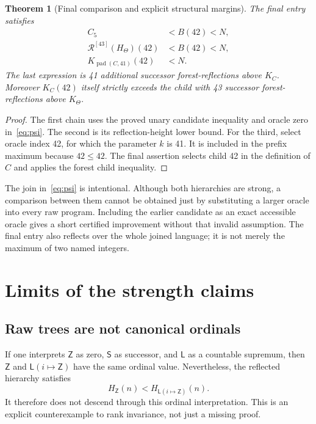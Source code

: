 \documentclass[11pt,a4paper]{article}
\newtheorem{theorem}{Theorem}[section]
\theoremstyle{definition}
\newcommand{\pad}{\operatorname{pad}}
\newcommand{\R}{\mathcal R}
\begin{document}
\begin{theorem}[Final comparison and explicit structural margins]
The final entry satisfies
\begin{align*}
 C_5&<B(42)<N,\\
 \R^{[43]}(H_\Theta)(42)&<B(42)<N,\\
 K_{\pad(C,41)}(42)&<N.
\end{align*}
The last expression is 41 additional successor forest-reflections above
\(K_C\). Moreover \(K_C(42)\) itself strictly exceeds the child with
43 successor forest-reflections above \(K_\Theta\).
\end{theorem}
\begin{proof}
The first chain uses the proved unary candidate inequality and oracle zero
in~\eqref{eq:psi}. The second is its reflection-height lower bound. For the
third, select oracle index 42, for which the parameter \(k\) is 41. It is
included in the prefix maximum because \(42\le42\). The final assertion
selects child 42 in the definition of \(C\) and applies the forest child
inequality.
\end{proof}

The join in~\eqref{eq:psi} is intentional. Although both hierarchies are
strong, a comparison between them cannot be obtained just by substituting
a larger oracle into every raw program. Including the earlier candidate as
an exact accessible oracle gives a short certified improvement without that
invalid assumption. The final entry also reflects over the whole joined
language; it is not merely the maximum of two named integers.

\section{Limits of the strength claims}
\label{sec:limits}

\subsection{Raw trees are not canonical ordinals}

If one interprets \(\mathsf Z\) as zero, \(\mathsf S\) as successor, and
\(\mathsf L\) as a countable supremum, then
\(\mathsf Z\) and \(\mathsf L(i\mapsto\mathsf Z)\) have the same ordinal
value. Nevertheless, the reflected hierarchy satisfies
\[
       H_{\mathsf Z}(n)<H_{\mathsf L(i\mapsto\mathsf Z)}(n).
\]
It therefore does not descend through this ordinal interpretation. This is
an explicit counterexample to rank invariance, not just a missing proof.
\end{document}

